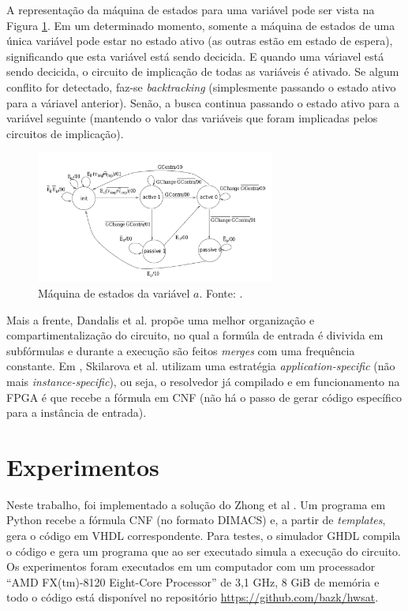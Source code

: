 \documentclass[12pt,a4paper]{article}
\begin{document}
A representação da máquina de estados para uma variável pode ser vista na Figura \ref{fig:fsm}. Em um determinado momento, somente a máquina de estados de uma única variável pode estar no estado ativo (as outras estão em estado de espera), significando que esta variável está sendo decicida. E quando uma váriavel está sendo decicida, o circuito de implicação de todas as variáveis é ativado. Se algum conflito for detectado, faz-se \textit{backtracking} (simplesmente passando o estado ativo para a váriavel anterior). Senão, a busca continua passando o estado ativo para a variável seguinte (mantendo o valor das variáveis que foram implicadas pelos circuitos de implicação).

\begin{figure}[H]
    \centering
    \includegraphics[width=0.7\textwidth]{figures/fsm}
    \caption{Máquina de estados da variável $a$. Fonte: \cite{zhong1998usingreconfigurable}.}
    \label{fig:fsm}
\end{figure}

Mais a frente, Dandalis et al. \cite{dandalis2002runtimeperformance} propõe uma melhor organização e compartimentalização do circuito, no qual a formúla de entrada é divivida em subfórmulas e durante a execução são feitos \textit{merges} com uma frequência constante. Em \cite{skilarova2004asoftware}, Skilarova et al. utilizam uma estratégia \textit{application-specific} (não mais \textit{instance-specific}), ou seja, o resolvedor já compilado e em funcionamento na FPGA é que recebe a fórmula em CNF (não há o passo de gerar código específico para a instância de entrada).

\section{Experimentos}
\label{sec:exp}

Neste trabalho, foi implementado a solução do Zhong et al \cite{zhong1998usingreconfigurable}. Um programa em Python recebe a fórmula CNF (no formato DIMACS) e, a partir de \textit{templates}, gera o código em VHDL correspondente. Para testes, o simulador GHDL compila o código e gera um programa que ao ser executado simula a execução do circuito. Os experimentos foram executados em um computador com um processador ``AMD FX(tm)-8120 Eight-Core Processor'' de 3,1 GHz, 8 GiB de memória e todo o código está disponível no repositório \url{https://github.com/bazk/hwsat}.
\end{document}

